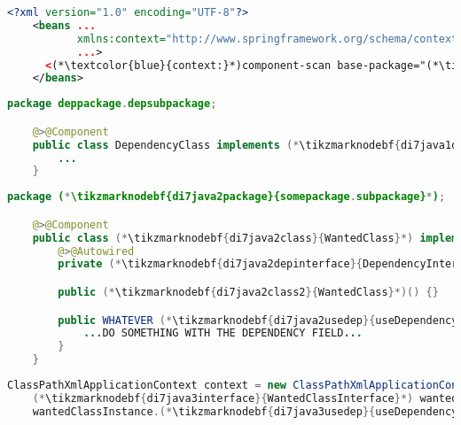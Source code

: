 \begin{lstlisting}[language=XML, title={Configuration XML}]
    <?xml version="1.0" encoding="UTF-8"?>
    <beans ...
           xmlns:context="http://www.springframework.org/schema/context"
           ...>
      <(*\textcolor{blue}{context:}*)component-scan base-package="(*\tikzmarknodebf{di7xml1package}{somepackage.subpackage}[ForestGreen]*)"/>
    </beans>
\end{lstlisting}
\begin{lstlisting}[language=Java, title={Dependency class}]
    package deppackage.depsubpackage;

    @>@Component
    public class DependencyClass implements (*\tikzmarknodebf{di7java1depinterface}{DependencyInterface}*) {
        ...
    }
\end{lstlisting}
\begin{lstlisting}[language=Java, title={Wanted class with the zero--parameter constructor}]
    package (*\tikzmarknodebf{di7java2package}{somepackage.subpackage}*);

    @>@Component
    public class (*\tikzmarknodebf{di7java2class}{WantedClass}*) implements (*\tikzmarknodebf{di7java2interface}{WantedClassInterface}*) {
        @>@Autowired
        private (*\tikzmarknodebf{di7java2depinterface}{DependencyInterface}*) dependencyField;

        public (*\tikzmarknodebf{di7java2class2}{WantedClass}*)() {}

        public WHATEVER (*\tikzmarknodebf{di7java2usedep}{useDependency}*)() {
            ...DO SOMETHING WITH THE DEPENDENCY FIELD...
        }
    }
\end{lstlisting}
\begin{lstlisting}[language=Java, title={Usage}]
    ClassPathXmlApplicationContext context = new ClassPathXmlApplicationContext("configurationFile.xml");
    (*\tikzmarknodebf{di7java3interface}{WantedClassInterface}*) wantedClassInstance = context.getBean("(*\tikzmarknodebf{di7java3beanid}{wantedClass}[ForestGreen]*)", (*\tikzmarknodebf{di7java3interface2}{WantedClassInterface}*).class);
    wantedClassInstance.(*\tikzmarknodebf{di7java3usedep}{useDependency}*)();
\end{lstlisting}
\newpage

